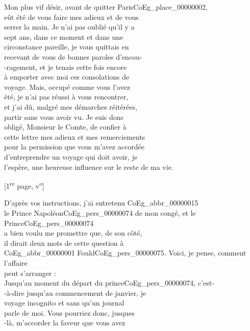 \documentclass{book}
\begin{document}
Mon plus vif désir, avant de quitter Paris\gls{CoEg_place_00000002},\\
eût été de vous faire mes adieux et de vous\\
serrer la main. Je n’ai pas oublié qu'il y a\\
sept ans, dans ce moment et dans une\\
circonstance pareille, je vous quittais en\\
recevant de vous de bonnes paroles d’encou-\\
-ragement, et je tenais cette fois encore\\
à emporter avec moi ces consolations de\\
voyage. Mais, occupé comme vous l’avez\\
été, je n’ai pas réussi à vous rencontrer,\\
et j’ai dû, malgré mes démarches réitérées,\\
partir sans vous avoir vu. Je suis donc\\
obligé, Monsieur le Comte, de confier à\\
cette lettre mes adieux et mes remerciements\\
pour la permission que vous m’avez accordée\\
d’entreprendre un voyage qui doit avoir, je\\
l’espère, une heureuse influence sur le reste de ma vie.
{\footnotesize\begin{center} {[1\textsuperscript{re} page, v\textsuperscript{o}]}\end{center}}
\indent D’après vos instructions, j’ai entretenu \gls{CoEg_abbr_00000015}\\
le Prince Napoléon\gls{CoEg_pers_00000074} de mon congé, et le Prince\gls{CoEg_pers_00000074}\\
a bien voulu me promettre que, de son côté,\\
il dirait deux mots de cette question à\\
\gls{CoEg_abbr_00000001} Fould\gls{CoEg_pers_00000075}. Voici, je pense, comment l’affaire\\
peut s’arranger :\\
\indent Jusqu’au moment du départ du prince\gls{CoEg_pers_00000074}, c’est-\\
-à-dire jusqu’au commencement de janvier, je\\
voyage incognito et sans qu’un journal\\
parle de moi. Vous pourriez donc, jusques\\
-là, m’accorder la faveur que vous avez\\
\end{document}
